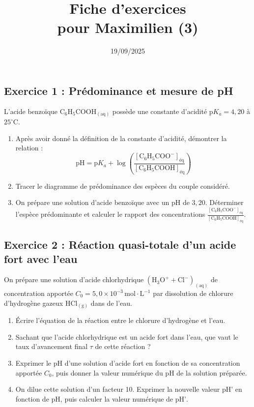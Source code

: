 \documentclass[12pt,a4paper]{article}
\title{Fiche d'exercices \\ pour Maximilien (3)}
\date{19/09/2025}
\author{}
\begin{document}
\maketitle


\subsection*{Exercice 1 : Prédominance et mesure de pH}

L'acide benzoïque $\text{C}_6\text{H}_5\text{COOH}_{(\text{aq})}$ possède une constante d'acidité $\text{p}K_a = 4,20$ à $25^\circ\text{C}$.

\begin{enumerate}
    \item Après avoir donné la définition de la constante d'acidité, démontrer la relation :
    \[ \text{pH} = \text{p}K_a + \log\left( \frac{[\text{C}_6\text{H}_5\text{COO}^-]_{\text{éq}}}{[\text{C}_6\text{H}_5\text{COOH}]_{\text{éq}}} \right) \]
    \item Tracer le diagramme de prédominance des espèces du couple considéré.
    \item On prépare une solution d'acide benzoïque avec un $\text{pH}$ de $3,20$. Déterminer l'espèce prédominante et calculer le rapport des concentrations $\frac{[\text{C}_6\text{H}_5\text{COO}^-]_{\text{éq}}}{[\text{C}_6\text{H}_5\text{COOH}]_{\text{éq}}}$.
\end{enumerate}

\subsection*{Exercice 2 : Réaction quasi-totale d'un acide fort avec l'eau}

On prépare une solution d'acide chlorhydrique $(\text{H}_3\text{O}^+ + \text{Cl}^-)_{(\text{aq})}$ de concentration apportée $C_0 = 5,0 \times 10^{-3}\,\text{mol}\cdot\text{L}^{-1}$ par dissolution de chlorure d'hydrogène gazeux $\text{HCl}_{(\text{g})}$ dans de l'eau.

\begin{enumerate}
    \item Écrire l'équation de la réaction entre le chlorure d'hydrogène et l'eau.
    \item Sachant que l'acide chlorhydrique est un acide fort dans l'eau, que vaut le taux d'avancement final $\tau$ de cette réaction ?
    \item Exprimer le $\text{pH}$ d'une solution d'acide fort en fonction de sa concentration apportée $C_0$, puis donner la valeur numérique du $\text{pH}$ de la solution préparée.
    \item On dilue cette solution d'un facteur 10. Exprimer la nouvelle valeur $\text{pH'}$ en fonction de $\text{pH}$, puis calculer la valeur numérique de $\text{pH'}$. 
\end{enumerate}
\end{document}
